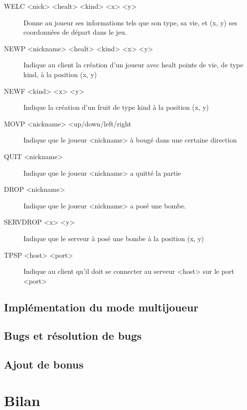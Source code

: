 \documentclass[12pt]{article}
\begin{document}
\begin{description}
\item[WELC <nick> <healt> <kind> <x> <y>] Donne au joueur ses informations tels que son type, sa vie, et (x, y) ses coordonnées de départ dans le jeu.
\item[NEWP <nickname> <healt> <kind> <x> <y>] Indique au client la création d'un joueur avec healt points de vie, de type kind, à la position (x, y)
\item[NEWF <kind> <x> <y>] Indique la création d'un fruit de type kind à la position (x, y)
\item[MOVP <nickname> <up/down/left/right] Indique que le joueur <nickname> à bougé dans une certaine direction
\item[QUIT <nickname>] Indique que le joueur <nickname> a quitté la partie
\item[DROP <nickname>] Indique que le joueur <nickname> a posé une bombe.
\item[SERVDROP <x> <y>] Indique que le serveur à posé une bombe à la position (x, y)
\item[TPSP <host> <port>] Indique au client qu'il doit se connecter au serveur <host> sur le port <port>

\end{description}


\subsection{Implémentation du mode multijoueur}

\subsection{Bugs et résolution de bugs}

\subsection{Ajout de bonus}
\newpage

\section{Bilan}
\end{document}
